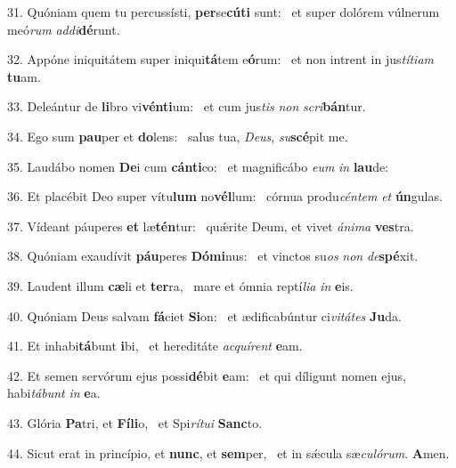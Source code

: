 31. Quóniam quem tu percussísti, \textbf{per}se\textbf{cú}\textbf{ti} sunt: \ast\  et super dolórem vúlnerum meó\textit{rum} \textit{ad}\textit{di}\textbf{dé}runt.\

32. Appóne iniquitátem super iniqui\textbf{tá}tem e\textbf{ó}rum: \ast\  et non intrent in jus\textit{tí}\textit{ti}\textit{am} \textbf{tu}am.\

33. Deleántur de \textbf{li}bro vi\textbf{vén}\textbf{ti}um: \ast\  et cum jus\textit{tis} \textit{non} \textit{scri}\textbf{bán}tur.\

34. Ego sum \textbf{pau}per et \textbf{do}lens: \ast\  salus tua, \textit{De}\textit{us}, \textit{su}\textbf{scé}pit me.\

35. Laudábo nomen \textbf{De}i cum \textbf{cán}\textbf{ti}co: \ast\  et magnificábo \textit{e}\textit{um} \textit{in} \textbf{lau}de:\

36. Et placébit Deo super vítu\textbf{lum} no\textbf{vél}lum: \ast\  córnua produ\textit{cén}\textit{tem} \textit{et} \textbf{ún}gulas.\

37. Vídeant páuperes \textbf{et} læ\textbf{tén}tur: \ast\  quǽrite Deum, et vivet \textit{á}\textit{ni}\textit{ma} \textbf{ves}tra.\

38. Quóniam exaudívit \textbf{páu}peres \textbf{Dó}\textbf{mi}nus: \ast\  et vinctos su\textit{os} \textit{non} \textit{de}\textbf{spé}xit.\

39. Laudent illum \textbf{cæ}li et \textbf{ter}ra, \ast\  mare et ómnia reptí\textit{li}\textit{a} \textit{in} \textbf{e}is.\

40. Quóniam Deus salvam \textbf{fá}ciet \textbf{Si}on: \ast\  et ædificabúntur ci\textit{vi}\textit{tá}\textit{tes} \textbf{Ju}da.\

41. Et inhabi\textbf{tá}bunt \textbf{i}bi, \ast\  et hereditáte \textit{ac}\textit{quí}\textit{rent} \textbf{e}am.\

42. Et semen servórum ejus possi\textbf{dé}bit \textbf{e}am: \ast\  et qui díligunt nomen ejus, habi\textit{tá}\textit{bunt} \textit{in} \textbf{e}a.\

43. Glória \textbf{Pa}tri, et \textbf{Fí}\textbf{li}o, \ast\  et Spi\textit{rí}\textit{tu}\textit{i} \textbf{Sanc}to.\

44. Sicut erat in princípio, et \textbf{nunc}, et \textbf{sem}per, \ast\  et in sǽcula sæ\textit{cu}\textit{ló}\textit{rum}. \textbf{A}men.\

